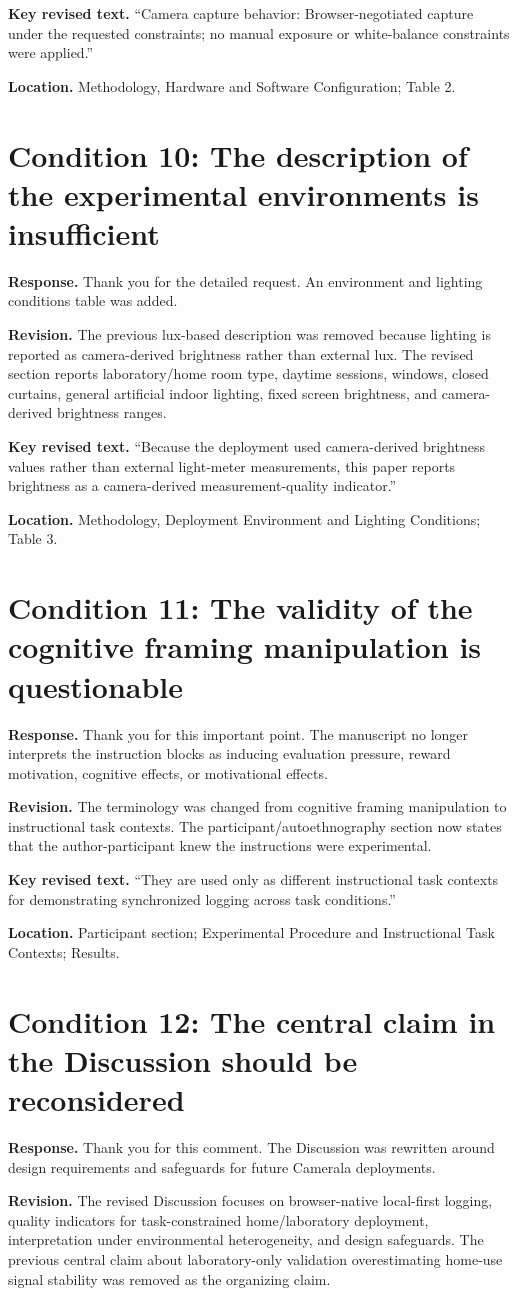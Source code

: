 \documentclass[11pt]{article}
\newcommand{\condition}[2]{\section*{Condition #1: #2}}
\begin{document}
\textbf{Key revised text.}
``Camera capture behavior: Browser-negotiated capture under the requested constraints; no manual exposure or white-balance constraints were applied.''

\textbf{Location.}
Methodology, Hardware and Software Configuration; Table 2.

\condition{10}{The description of the experimental environments is insufficient}
\textbf{Response.}
Thank you for the detailed request.
An environment and lighting conditions table was added.

\textbf{Revision.}
The previous lux-based description was removed because lighting is reported as camera-derived brightness rather than external lux.
The revised section reports laboratory/home room type, daytime sessions, windows, closed curtains, general artificial indoor lighting, fixed screen brightness, and camera-derived brightness ranges.

\textbf{Key revised text.}
``Because the deployment used camera-derived brightness values rather than external light-meter measurements, this paper reports brightness as a camera-derived measurement-quality indicator.''

\textbf{Location.}
Methodology, Deployment Environment and Lighting Conditions; Table 3.

\condition{11}{The validity of the cognitive framing manipulation is questionable}
\textbf{Response.}
Thank you for this important point.
The manuscript no longer interprets the instruction blocks as inducing evaluation pressure, reward motivation, cognitive effects, or motivational effects.

\textbf{Revision.}
The terminology was changed from cognitive framing manipulation to instructional task contexts.
The participant/autoethnography section now states that the author-participant knew the instructions were experimental.

\textbf{Key revised text.}
``They are used only as different instructional task contexts for demonstrating synchronized logging across task conditions.''

\textbf{Location.}
Participant section; Experimental Procedure and Instructional Task Contexts; Results.

\condition{12}{The central claim in the Discussion should be reconsidered}
\textbf{Response.}
Thank you for this comment.
The Discussion was rewritten around design requirements and safeguards for future Camerala deployments.

\textbf{Revision.}
The revised Discussion focuses on browser-native local-first logging, quality indicators for task-constrained home/laboratory deployment, interpretation under environmental heterogeneity, and design safeguards.
The previous central claim about laboratory-only validation overestimating home-use signal stability was removed as the organizing claim.
\end{document}
